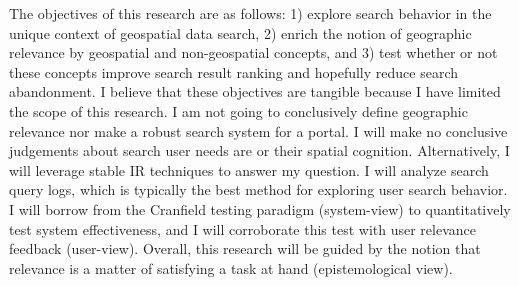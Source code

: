 The objectives of this research are as follows: 1) explore search behavior in the unique context of geospatial data search, 2) enrich the notion of geographic relevance by geospatial and non-geospatial concepts, and 3) test whether or not these concepts improve search result ranking and hopefully reduce search abandonment. I believe that these objectives are tangible because I have limited the scope of this research. I am not going to conclusively define geographic relevance nor make a robust search system for a portal. I will make no conclusive judgements about search user needs are or their spatial cognition. Alternatively, I will leverage stable IR techniques to answer my question. I will analyze search query logs, which is typically the best method for exploring user search behavior. I will borrow from the Cranfield testing paradigm (system-view) to quantitatively test system effectiveness, and I will corroborate this test with user relevance feedback (user-view). Overall, this research will be guided by the notion that relevance is a matter of satisfying a task at hand (epistemological view).